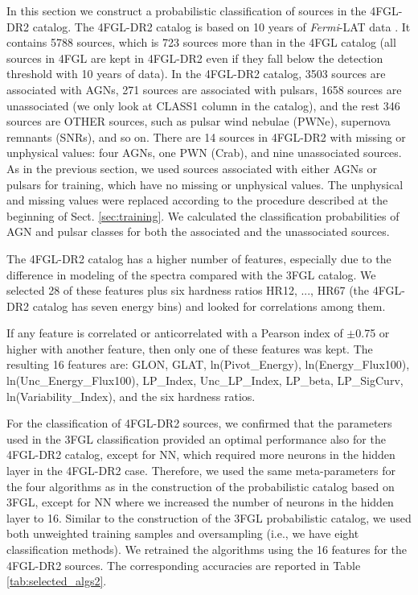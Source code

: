 \documentclass[referee]{aa} %
\newcommand{\Fermi}{\textit{Fermi}\xspace}
\begin{document}
In this section we construct a probabilistic classification of sources in the 4FGL-DR2 catalog. The 4FGL-DR2 catalog \citep{2020arXiv200511208B} 
is based on 10 years of \Fermi-LAT data \citep[compared to 8 years of data in the 4FGL catalog,][]{2020ApJS..247...33A}.
It contains 5788 sources, which is 723 sources more than in the 4FGL catalog (all sources in 4FGL are kept in 4FGL-DR2 even if they fall
below the detection threshold with 10 years of data). 
In the 4FGL-DR2 catalog,
3503 sources are associated with AGNs,
271 sources are associated with pulsars,
1658 sources are unassociated (we only look at CLASS1 column in the catalog), 
and the rest 346 sources are OTHER sources, such as pulsar wind nebulae (PWNe), %
supernova remnants (SNRs), and so on.
There are 14 sources in 4FGL-DR2 with missing or unphysical values: four AGNs, one PWN (Crab), and nine unassociated sources.
As in the previous section, we used sources associated with either AGNs or pulsars for training,
which have no missing or unphysical values.
The unphysical and missing values were replaced according to the procedure described at the beginning of Sect. \ref{sec:training}.
We calculated the classification probabilities of AGN and pulsar classes for both the associated and the unassociated sources.

The 4FGL-DR2 catalog has a higher number of features, especially due to the difference in modeling of the spectra compared with the 3FGL catalog. 
We selected 28 of these features plus six hardness ratios HR12, ..., HR67 (the 4FGL-DR2 catalog has seven energy bins)
and looked for correlations among them. 

If any feature is correlated or anticorrelated with a Pearson index of $\pm$0.75 or higher with another feature, then only one of these features was kept. 
The resulting 16 features are:
GLON, GLAT, ln(Pivot\_Energy), ln(Energy\_Flux100), ln(Unc\_Energy\_Flux100), LP\_Index, Unc\_LP\_Index, LP\_beta, LP\_SigCurv, ln(Variability\_Index), and the six hardness ratios.

For the classification of 4FGL-DR2 sources, we confirmed that the parameters used in the 3FGL classification provided an optimal performance also for the 4FGL-DR2 catalog, except for NN, which required more neurons in the hidden layer in the 4FGL-DR2 case.
Therefore, we used the same meta-parameters for the four algorithms as in the construction of the probabilistic catalog based on 3FGL, except for NN where we increased the number of neurons in the hidden layer to 16. Similar to the construction of the 3FGL probabilistic catalog, we used both unweighted training samples and oversampling (i.e., we have eight classification methods).
We retrained the algorithms using the 16 features for the 4FGL-DR2 sources.
The corresponding accuracies are reported in Table \ref{tab:selected_algs2}.
\end{document}
